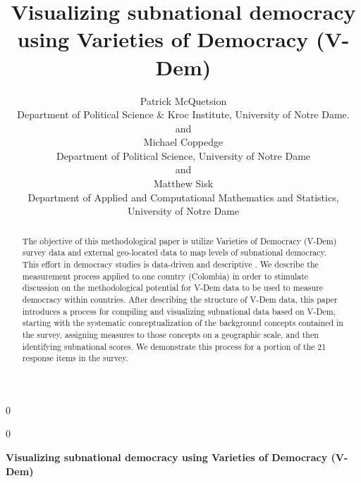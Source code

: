 \documentclass[12pt]{article}
\newcommand{\blind}{0}
\begin{document}
\def\spacingset#1{\renewcommand{\baselinestretch}%
{#1}\small\normalsize} \spacingset{1}



\blind
{
  \title{\bf Visualizing subnational democracy using Varieties of
Democracy (V-Dem)}

  \author{
        Patrick McQuetsion \\
    Department of Political Science \& Kroc Institute, University of
Notre Dame.\\
     and \\     Michael Coppedge \\
    Department of Political Science, University of Notre Dame\\
     and \\     Matthew Sisk \\
    Department of Applied and Computational Mathematics and Statistics,
University of Notre Dame\\
      }
  \maketitle
} \fi

\blind
{
  \bigskip
  \bigskip
  \bigskip
  \begin{center}
    {\LARGE\bf Visualizing subnational democracy using Varieties of
Democracy (V-Dem)}
  \end{center}
  \medskip
} \fi

\bigskip
\begin{abstract}
The objective of this methodological paper is utilize Varieties of
Democracy (V-Dem) survey data and external geo-located data to map
levels of subnational democracy. This effort in democracy studies is
data-driven and descriptive
\citep{coppedgeDemocratizationResearchMethods2012}. We describe the
measurement process applied to one country (Colombia) in order to
stimulate discussion on the methodological potential for V-Dem data to
be used to measure democracy within countries. After describing the
structure of V-Dem data, this paper introduces a process for compiling
and visualizing subnational data based on V-Dem, starting with the
systematic conceptualization of the background concepts contained in the
survey, assigning measures to those concepts on a geographic scale, and
then identifying subnational scores. We demonstrate this process for a
portion of the 21 response items in the survey.
\end{abstract}
\end{document}
